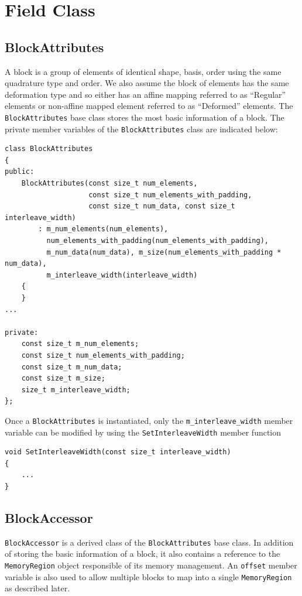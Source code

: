 \chapter{Field Class}

\section{BlockAttributes}
A block is a group of elements of identical shape, basis, order using
the same quadrature type and order. We also assume the block of
elements has the same deformation type and so either has an affine
mapping referred to as ``Regular'' elements or non-affine mapped
element referred to as ``Deformed'' elements. The
\lstinline[style=C++Style]!BlockAttributes! base class stores the most
basic information of a block. The private member variables of the
\lstinline[style=C++Style]!BlockAttributes! class are indicated below:

\begin{lstlisting}[style=C++Style]
class BlockAttributes
{   
public:
    BlockAttributes(const size_t num_elements,
                    const size_t num_elements_with_padding,
                    const size_t num_data, const size_t interleave_width)
        : m_num_elements(num_elements),
          num_elements_with_padding(num_elements_with_padding),
          m_num_data(num_data), m_size(num_elements_with_padding * num_data),
          m_interleave_width(interleave_width)
    {
    }
...

private:
    const size_t m_num_elements;
    const size_t num_elements_with_padding;
    const size_t m_num_data;
    const size_t m_size;
    size_t m_interleave_width;
};
\end{lstlisting}

Once a \lstinline[style=C++Style]!BlockAttributes! is instantiated, only the \lstinline[style=C++Style]!m_interleave_width! member variable can be modified by using the \lstinline[style=C++Style]!SetInterleaveWidth! member function
\begin{lstlisting}[style=C++Style]
void SetInterleaveWidth(const size_t interleave_width)
{
    ...
}
\end{lstlisting}


\section{BlockAccessor}
\lstinline[style=C++Style]!BlockAccessor! is a derived class of the
\lstinline[style=C++Style]!BlockAttributes! base class. In addition of
storing the basic information of a block, it also contains a reference
to the \lstinline[style=C++Style]!MemoryRegion! object responsible of
its memory management. An \lstinline[style=C++Style]!offset! member
variable is also used to allow multiple blocks to map into a single
\lstinline[style=C++Style]!MemoryRegion! as described later.

